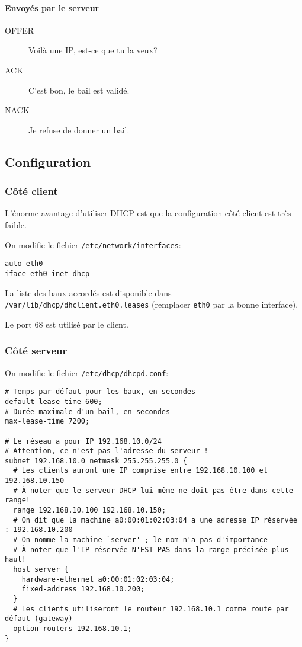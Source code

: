 \documentclass[10pt,a4paper,french]{article}
\begin{document}
\paragraph{Envoyés par le serveur}

\begin{description}
\item[OFFER] Voilà une IP, est-ce que tu la veux?
\item[ACK] C'est bon, le bail est validé.
\item[NACK] Je refuse de donner un bail.
\end{description}

\subsection{Configuration}

\subsubsection{Côté client}

L'énorme avantage d'utiliser DHCP est que la configuration côté client est très faible.

On modifie le fichier {\tt /etc/network/interfaces}:

\begin{verbatim}
auto eth0
iface eth0 inet dhcp
\end{verbatim}

La liste des baux accordés est disponible dans {\tt /var/lib/dhcp/dhclient.eth0.leases} (remplacer {\tt eth0} par la bonne interface).

Le port 68 est utilisé par le client.

\subsubsection{Côté serveur}

On modifie le fichier {\tt /etc/dhcp/dhcpd.conf}:

\begin{verbatim}
# Temps par défaut pour les baux, en secondes
default-lease-time 600;
# Durée maximale d'un bail, en secondes
max-lease-time 7200;

# Le réseau a pour IP 192.168.10.0/24
# Attention, ce n'est pas l'adresse du serveur !
subnet 192.168.10.0 netmask 255.255.255.0 {
  # Les clients auront une IP comprise entre 192.168.10.100 et 192.168.10.150
  # À noter que le serveur DHCP lui-même ne doit pas être dans cette range!
  range 192.168.10.100 192.168.10.150;
  # On dit que la machine a0:00:01:02:03:04 a une adresse IP réservée : 192.168.10.200
  # On nomme la machine `server' ; le nom n'a pas d'importance
  # À noter que l'IP réservée N'EST PAS dans la range précisée plus haut!
  host server {
    hardware-ethernet a0:00:01:02:03:04;
    fixed-address 192.168.10.200;
  }
  # Les clients utiliseront le routeur 192.168.10.1 comme route par défaut (gateway)
  option routers 192.168.10.1;
}
\end{verbatim}
\end{document}

